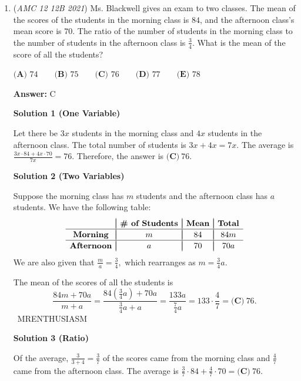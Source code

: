 \begin{enumerate}
	\item (\textit{AMC 12 12B 2021}) Ms. Blackwell gives an exam to two classes. The mean of the scores of the students in the morning class is $84$, and the afternoon class's mean score is $70$. The ratio of the number of students in the morning class to the number of students in the afternoon class is $\frac34$. What is the mean of the score of all the students?


 $\textbf{(A) }74 \qquad \textbf{(B) }75 \qquad \textbf{(C) }76 \qquad \textbf{(D) }77 \qquad \textbf{(E) }78$

 \textbf{Answer: }C



\textbf{Solution 1 (One Variable)}

Let there be $3x$ students in the morning class and $4x$ students in the afternoon class. The total number of students is $3x + 4x = 7x$. The average is $\frac{3x\cdot84 + 4x\cdot70}{7x}=76$. Therefore, the answer is $\boxed{\textbf{(C)} ~76}$.

 



\textbf{Solution 2 (Two Variables)}

Suppose the morning class has $m$ students and the afternoon class has $a$ students. We have the following table:
 \[\begin{array}{c|c|c|c} & & & \\ [-2.5ex] & \textbf{\# of Students} & \textbf{Mean} & \textbf{Total} \\ \hline & & & \\ [-2.5ex] \textbf{Morning} & m & 84 & 84m \\ \hline & & & \\ [-2.5ex] \textbf{Afternoon} & a & 70 & 70a \end{array}\]We are also given that $\frac ma=\frac34,$ which rearranges as $m=\frac34a.$

 The mean of the scores of all the students is 
 \[\frac{84m+70a}{m+a}=\frac{84\left(\frac34a\right)+70a}{\frac34a+a}=\frac{133a}{\frac74a}=133\cdot\frac47=\boxed{\textbf{(C)} ~76}.\]~MRENTHUSIASM

 



\textbf{Solution 3 (Ratio)}

Of the average, $\frac{3}{3+4}=\frac{3}{7}$ of the scores came from the morning class and $\frac{4}{7}$ came from the afternoon class. The average is $\frac{3}{7}\cdot 84+\frac{4}{7}\cdot 70=\boxed{\textbf{(C)} ~76}.$





\end{enumerate}
